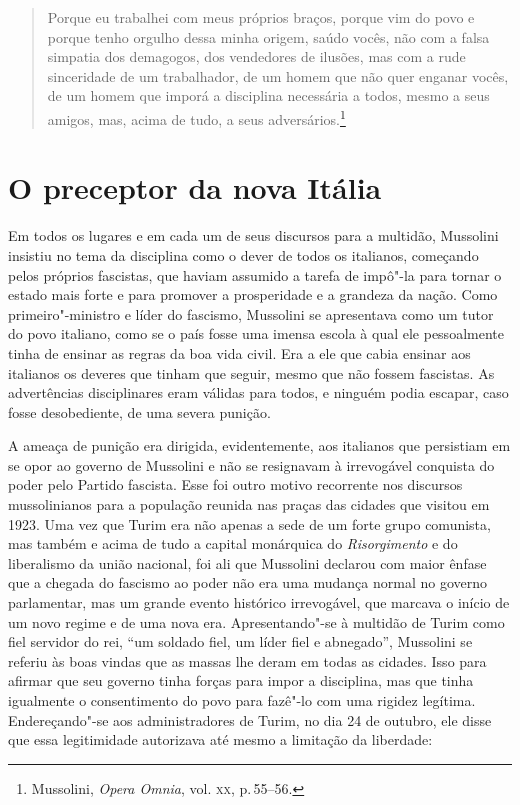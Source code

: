 \begin{quote}
Porque eu trabalhei com meus próprios braços, porque vim do povo e
porque tenho orgulho dessa minha origem, saúdo vocês, não com a falsa
simpatia dos demagogos, dos vendedores de ilusões, mas com a rude
sinceridade de um trabalhador, de um homem que não quer enganar vocês,
de um homem que imporá a disciplina necessária a todos, mesmo a seus
amigos, mas, acima de tudo, a seus adversários.\footnote{Mussolini,
  \emph{Opera Omnia}, vol. \textsc{xx}, p.\,55--56.}
\end{quote}

\section{O preceptor da nova Itália}

Em todos os lugares e em cada um de seus discursos para a multidão,
Mussolini insistiu no tema da disciplina como o dever de todos os
italianos, começando pelos próprios fascistas, que haviam assumido a
tarefa de impô"-la para tornar o estado mais forte e para promover a
prosperidade e a grandeza da nação. Como primeiro"-ministro e líder do
fascismo, Mussolini se apresentava como um tutor do povo italiano, como
se o país fosse uma imensa escola à qual ele pessoalmente tinha de
ensinar as regras da boa vida civil. Era a ele que cabia ensinar aos
italianos os deveres que tinham que seguir, mesmo que não fossem
fascistas. As advertências disciplinares eram válidas para todos, e
ninguém podia escapar, caso fosse desobediente, de uma severa punição.

A ameaça de punição era dirigida, evidentemente, aos italianos que
persistiam em se opor ao governo de Mussolini e não se resignavam à
irrevogável conquista do poder pelo Partido fascista. Esse foi outro
motivo recorrente nos discursos mussolinianos para a população reunida
nas praças das cidades que visitou em 1923. Uma vez que Turim era não
apenas a sede de um forte grupo comunista, mas também e acima de tudo a
capital monárquica do \emph{Risorgimento} e do liberalismo da união
nacional, foi ali que Mussolini declarou com maior ênfase que a chegada
do fascismo ao poder não era uma mudança normal no governo parlamentar,
mas um grande evento histórico irrevogável, que marcava o início de um
novo regime e de uma nova era. Apresentando"-se à multidão de Turim como
fiel servidor do rei, ``um soldado fiel, um líder fiel e abnegado'',
Mussolini se referiu às boas vindas que as massas lhe deram em todas as
cidades. Isso para afirmar que seu governo tinha forças para impor a
disciplina, mas que tinha igualmente o consentimento do povo para
fazê"-lo com uma rigidez legítima. Endereçando"-se aos administradores de
Turim, no dia 24 de outubro, ele disse que essa legitimidade autorizava
até mesmo a limitação da liberdade:

